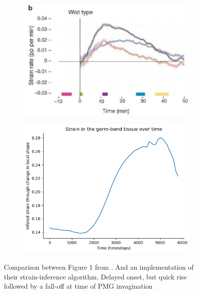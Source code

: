 \begin{figure}[H]
    \centering
    \begin{subfigure}{0.45\linewidth}
        \centering
        \includegraphics[width = \linewidth]{chapters/Results/figures/strain_rate_extrinsic.png}
    \end{subfigure}
        \begin{subfigure}{0.45\linewidth}
        \centering
        \includegraphics[width = \linewidth]{chapters/Results/figures/strain_smoothedpng.png}
    \end{subfigure}
    \label{fig:enter-label}
    \caption{Comparison between Figure 1 from \cite{butler2009cell}. And an implementation of their strain-inference algorithm. Delayed onset, but quick rise followed by a fall-off at time of PMG invagination}
\end{figure}

